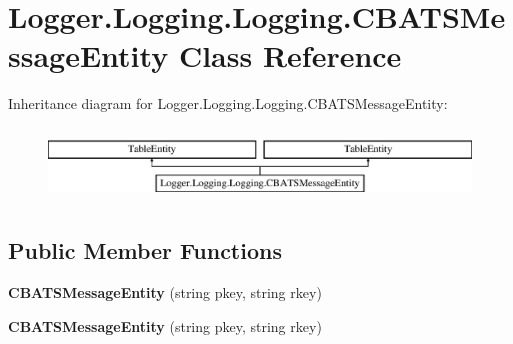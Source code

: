 \hypertarget{a00025}{}\section{Logger.\+Logging.\+Logging.\+C\+B\+A\+T\+S\+Message\+Entity Class Reference}
\label{a00025}
Inheritance diagram for Logger.\+Logging.\+Logging.\+C\+B\+A\+T\+S\+Message\+Entity\+:\begin{figure}[H]
\begin{center}
\leavevmode
\includegraphics[height=1.964912cm]{a00025}
\end{center}
\end{figure}
\subsection*{Public Member Functions}
\begin{DoxyCompactItemize}
\item 
{\bfseries C\+B\+A\+T\+S\+Message\+Entity} (string pkey, string rkey)\hypertarget{a00025_ac00d1ec7e6dd95b76bd5a2d21ec821f3}{}\label{a00025_ac00d1ec7e6dd95b76bd5a2d21ec821f3}

\item 
{\bfseries C\+B\+A\+T\+S\+Message\+Entity} (string pkey, string rkey)\hypertarget{a00025_ac00d1ec7e6dd95b76bd5a2d21ec821f3}{}\label{a00025_ac00d1ec7e6dd95b76bd5a2d21ec821f3}

\end{DoxyCompactItemize}

